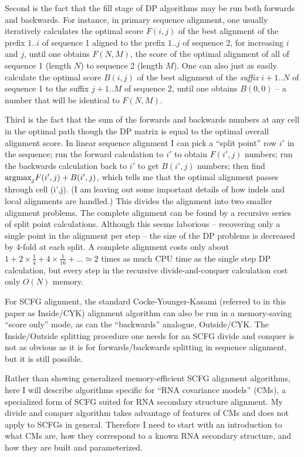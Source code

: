 \documentclass[11pt]{article}
\def\argmax{\mbox{\rm{argmax}}}      %
\begin{document}
Second is the fact that the fill stage of DP algorithms may be run
both forwards and backwards. For instance, in primary sequence
alignment, one usually iteratively calculates the optimal score
$F(i,j)$ of the best alignment of the prefix $1..i$ of sequence 1
aligned to the prefix $1..j$ of sequence 2, for increasing $i$ and
$j$, until one obtains $F(N,M)$, the score of the optimal alignment of
all of sequence 1 (length $N$) to sequence 2 (length $M$). One can
also just as easily calculate the optimal score $B(i,j)$ of the best
alignment of the
\emph{suffix} $i+1..N$ of sequence 1 to the suffix $j+1..M$ of sequence 2,
until one obtains $B(0,0)$ -- a number that will be identical to
$F(N,M)$.

Third is the fact that the sum of the forwards and backwards numbers
at any cell in the optimal path though the DP matrix is equal to the
optimal overall alignment score. In linear sequence alignment I can
pick a ``split point'' row $i'$ in the sequence; run the forward
calculation to $i'$ to obtain $F(i',j)$ numbers; run the backwards
calculation back to $i'$ to get $B(i',j)$ numbers; then find
$\argmax_j F(i',j) + B(i',j)$, which tells me that the optimal
alignment passes through cell (i',j). (I am leaving out some important
details of how indels and local alignments are handled.) This divides
the alignment into two smaller alignment problems. The complete
alignment can be found by a recursive series of split point
calculations. Although this seems laborious -- recovering only a
single point in the alignment per step -- the size of the DP problems
is decreased by 4-fold at each split. A complete alignment costs only
about $1 + 2 \times \frac{1}{4} + 4 \times \frac{1}{16} + \ldots
\simeq 2$ times as much CPU time as the single step DP calculation,
but every step in the recursive divide-and-conquer calculation cost
only $O(N)$ memory.

For SCFG alignment, the standard Cocke-Younger-Kasami (referred to in
this paper as Inside/CYK) alignment algorithm can also be run in a
memory-saving ``score only'' mode, as can the ``backwards'' analogue,
Outside/CYK. The Inside/Outside splitting procedure one needs for an
SCFG divide and conquer is not as obvious as it is for
forwards/backwards splitting in sequence alignment, but it is still
possible.

Rather than showing generalized memory-efficient SCFG alignment
algorithms, here I will describe algorithms specific for ``RNA
covariance models'' (CMs), a specialized form of SCFG suited for RNA
secondary structure alignment. My divide and conquer algorithm takes
advantage of features of CMs and does not apply to SCFGs in
general. Therefore I need to start with an introduction to what CMs
are, how they correspond to a known RNA secondary structure, and how
they are built and parameterized.
      
\end{document}
